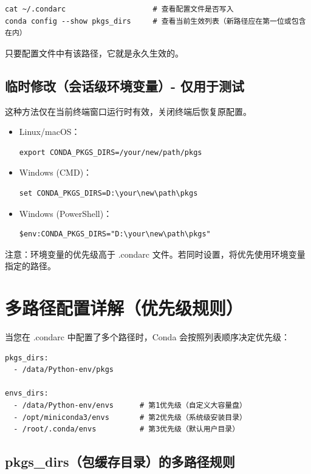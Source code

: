 \documentclass[12pt,UTF8]{ctexbook}
\begin{document}
\begin{lstlisting}
cat ~/.condarc                    # 查看配置文件是否写入
conda config --show pkgs_dirs     # 查看当前生效列表（新路径应在第一位或包含在内）
\end{lstlisting}

只要配置文件中有该路径，它就是永久生效的。

\section{临时修改（会话级环境变量）- 仅用于测试}
\label{sec:temporary_modification}

这种方法仅在当前终端窗口运行时有效，关闭终端后恢复原配置。

\begin{itemize}[leftmargin=2cm]
    \item Linux/macOS：
        \begin{lstlisting}
export CONDA_PKGS_DIRS=/your/new/path/pkgs
        \end{lstlisting}
    \item Windows (CMD)：
        \begin{lstlisting}
set CONDA_PKGS_DIRS=D:\your\new\path\pkgs
        \end{lstlisting}
    \item Windows (PowerShell)：
        \begin{lstlisting}
$env:CONDA_PKGS_DIRS="D:\your\new\path\pkgs"
        \end{lstlisting}
\end{itemize}

注意：环境变量的优先级高于 .condarc 文件。若同时设置，将优先使用环境变量指定的路径。

\chapter{多路径配置详解（优先级规则）}
\label{chap:multi_path_config}

当您在 .condarc 中配置了多个路径时，Conda 会按照列表顺序决定优先级：

\begin{lstlisting}
pkgs_dirs:
  - /data/Python-env/pkgs

envs_dirs:
  - /data/Python-env/envs      # 第1优先级（自定义大容量盘）
  - /opt/miniconda3/envs       # 第2优先级（系统级安装目录）
  - /root/.conda/envs          # 第3优先级（默认用户目录）
\end{lstlisting}

\section{pkgs\_dirs（包缓存目录）的多路径规则}
\label{sec:pkgs_dirs_rules}
\end{document}
